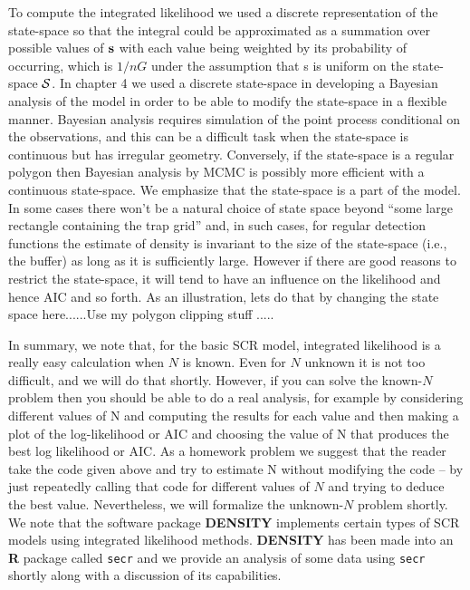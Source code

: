 To compute the integrated likelihood we used a discrete representation
of the state-space so that the integral could be approximated as a
summation over possible values of ${\bf s}$ with each value being
weighted by its probability of occurring, which is $1/nG$ under the
assumption that s is uniform on the state-space ${\cal S}$. In chapter 4 we
used a discrete state-space in developing a Bayesian analysis of the
model in order to be able to modify the state-space in a flexible
manner. Bayesian analysis requires simulation of the point process
conditional on the observations, and this can be a difficult task when
the state-space is continuous but has irregular geometry.  Conversely,
if the state-space is a regular polygon then Bayesian analysis by MCMC
is possibly more efficient with a continuous state-space. We emphasize
that the state-space is a part of the model. In some cases there won’t
be a natural choice of state space beyond ``some large rectangle
containing the trap grid'' and, in such cases, for regular detection
functions the estimate of density is invariant to the size of the
state-space (i.e., the buffer) as long as it is sufficiently
large. However if there are good reasons to restrict the state-space,
it will tend to have an influence on the likelihood and hence AIC and
so forth.  As an illustration, lets do that by changing the state
space here......Use my polygon clipping stuff ..... 

In summary, we note that, for the basic SCR model, integrated
likelihood is a really easy calculation when $N$ is known. Even for $N$
unknown it is not too difficult, and we will do that shortly.
However, if you can solve the known-$N$ problem then you should be able
to do a real analysis, for example by considering different values of
N and computing the results for each value and then making a plot of
the log-likelihood or AIC and choosing the value of N that produces
the best log likelihood or AIC. As a homework problem we suggest that
the reader take the code given above and try to estimate N without
modifying the code – by just repeatedly calling that code for
different values of $N$ and trying to deduce the best value.
Nevertheless, we will formalize the unknown-$N$ problem shortly.  We
note that the software package {\bf DENSITY} \citep{efford_etal:2004} implements
certain types of SCR models using integrated likelihood methods.
{\bf DENSITY} has been made into an {\bf R} package called \mbox{\tt secr} \citep{efford:2011}
and we provide an analysis of some data using \mbox{\tt secr} shortly along
with a discussion of its capabilities.


